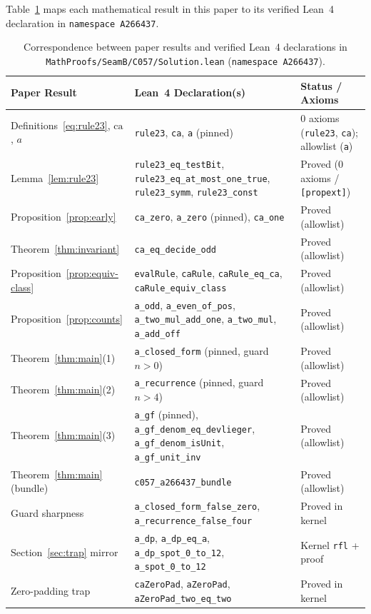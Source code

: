 \documentclass[11pt]{article}
\theoremstyle{definition}
\newcommand{\ca}{\mathrm{ca}}
\begin{document}
Table~\ref{tab:lean-map} maps each mathematical result in this paper to its verified Lean~4 declaration in \texttt{namespace A266437}.

\begin{table}[ht]
\centering
\caption{Correspondence between paper results and verified Lean~4 declarations in \nolinkurl{MathProofs/SeamB/C057/Solution.lean} (\texttt{namespace A266437}).}
\label{tab:lean-map}
\smallskip
{\small
\begin{tabular}{@{}l >{\raggedright\arraybackslash}p{6.5cm} >{\raggedright\arraybackslash}p{4.3cm}@{}}
\toprule
Paper Result & Lean~4 Declaration(s) & Status / Axioms \\
\midrule
Definitions~\eqref{eq:rule23}, $\ca$, $a$ & \texttt{rule23}, \texttt{ca}, \texttt{a} (pinned) & $0$ axioms (\texttt{rule23}, \texttt{ca}); allowlist (\texttt{a}) \\
Lemma~\ref{lem:rule23} & \texttt{rule23\_eq\_testBit}, \texttt{rule23\_eq\_at\_most\_one\_true}, \texttt{rule23\_symm}, \texttt{rule23\_const} & Proved ($0$ axioms / \texttt{[propext]}) \\
Proposition~\ref{prop:early} & \texttt{ca\_zero}, \texttt{a\_zero} (pinned), \texttt{ca\_one} & Proved (allowlist) \\
Theorem~\ref{thm:invariant} & \texttt{ca\_eq\_decide\_odd} & Proved (allowlist) \\
Proposition~\ref{prop:equiv-class} & \texttt{evalRule}, \texttt{caRule}, \texttt{caRule\_eq\_ca}, \texttt{caRule\_equiv\_class} & Proved (allowlist) \\
Proposition~\ref{prop:counts} & \texttt{a\_odd}, \texttt{a\_even\_of\_pos}, \texttt{a\_two\_mul\_add\_one}, \texttt{a\_two\_mul}, \texttt{a\_add\_off} & Proved (allowlist) \\
Theorem~\ref{thm:main}(1) & \texttt{a\_closed\_form} (pinned, guard $n > 0$) & Proved (allowlist) \\
Theorem~\ref{thm:main}(2) & \texttt{a\_recurrence} (pinned, guard $n > 4$) & Proved (allowlist) \\
Theorem~\ref{thm:main}(3) & \texttt{a\_gf} (pinned), \texttt{a\_gf\_denom\_eq\_devlieger}, \texttt{a\_gf\_denom\_isUnit}, \texttt{a\_gf\_unit\_inv} & Proved (allowlist) \\
Theorem~\ref{thm:main} (bundle) & \texttt{c057\_a266437\_bundle} & Proved (allowlist) \\
Guard sharpness & \texttt{a\_closed\_form\_false\_zero}, \texttt{a\_recurrence\_false\_four} & Proved in kernel \\
Section~\ref{sec:trap} mirror & \texttt{a\_dp}, \texttt{a\_dp\_eq\_a}, \texttt{a\_dp\_spot\_0\_to\_12}, \texttt{a\_spot\_0\_to\_12} & Kernel \texttt{rfl} + proof \\
Zero-padding trap & \texttt{caZeroPad}, \texttt{aZeroPad}, \texttt{aZeroPad\_two\_eq\_two} & Proved in kernel \\
\bottomrule
\end{tabular}
}
\end{table}
\end{document}
